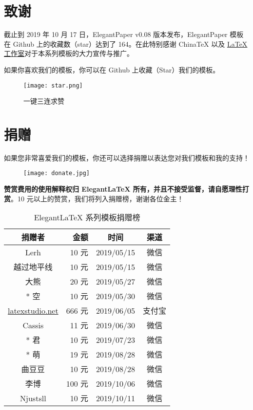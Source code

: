 \documentclass[lang=cn,11pt,a4paper]{elegantpaper}
\begin{document}
\section{致谢}
截止到 2019 年 10 月 17 日，ElegantPaper v0.08 版本发布，ElegantPaper 模板在 Github 上的收藏数（star）达到了 164。在此特别感谢 China\TeX{} 以及 \href{http://www.latexstudio.net/}{\LaTeX{} 工作室}对于本系列模板的大力宣传与推广。

如果你喜欢我们的模板，你可以在 Github 上收藏（Star）我们的模板。
\begin{figure}[htbp]
  \centering
  \texttt{[image: star.png]}
  \caption{一键三连求赞}
\end{figure}

\section{捐赠}
如果您非常喜爱我们的模板，你还可以选择捐赠以表达您对我们模板和我的支持！

\begin{figure}[htbp]
  \centering
  \texttt{[image: donate.jpg]}
\end{figure}

\textbf{赞赏费用的使用解释权归 Elegant\LaTeX{} 所有，并且不接受监督，请自愿理性打赏}。10 元以上的赞赏，我们将列入捐赠榜，谢谢各位金主！

\begin{table}[!htbp]
  \centering
  \caption{Elegant\LaTeX{} 系列模板捐赠榜}
  \begin{tabular}{crcc}
    \toprule
    捐赠者   & 金额 & 时间 & 渠道 \\
    \midrule
    Lerh  & 10 元  & 2019/05/15 & 微信 \\
    越过地平线 & 10 元    & 2019/05/15 & 微信 \\
    大熊 &  20 元 & 2019/05/27 & 微信 \\
    * 空 & 10 元 & 2019/05/30 & 微信\\
    \href{http://www.latexstudio.net/}{latexstudio.net} & 666 元 & 2019/06/05 & 支付宝\\
    Cassis & 11 元 & 2019/06/30 & 微信\\
    * 君 & 10 元 & 2019/07/23 & 微信\\
    * 萌 & 19 元 & 2019/08/28 & 微信 \\
    曲豆豆 & 10 元 & 2019/08/28 & 微信 \\
    李博 & 100 元 & 2019/10/06 & 微信\\
    Njustsll & 10 元 & 2019/10/11 & 微信 \\
  \bottomrule
  \end{tabular}%
\end{table}%
\end{document}
